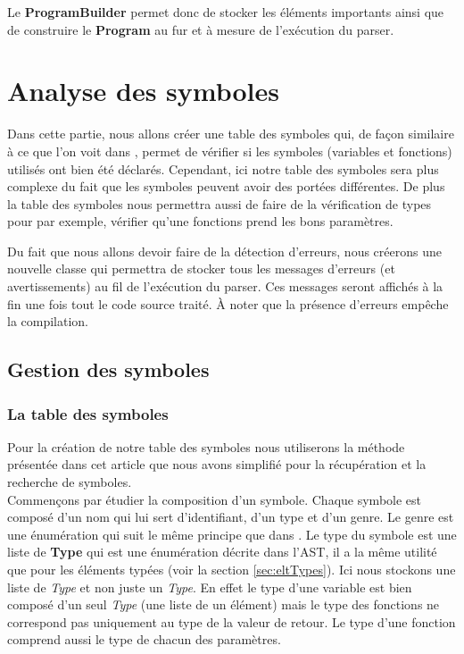 \documentclass[a4paper]{article}%
\begin{document}
Le \textbf{ProgramBuilder} permet donc de stocker les éléments importants ainsi
que de construire le \textbf{Program} au fur et à mesure de l'exécution du
\gls{parser}.


\section{Analyse des symboles}

Dans cette partie, nous allons créer une table des symboles qui, de façon
similaire à ce que l'on voit dans \cite{compilerFlexBison}, permet de vérifier
si les symboles (variables et fonctions) utilisés ont bien été déclarés.
Cependant, ici notre table des symboles sera plus complexe du fait que les
symboles peuvent avoir des portées différentes. De plus la table des symboles
nous permettra aussi de faire de la vérification de types pour par exemple,
vérifier qu'une fonctions prend les bons paramètres.

Du fait que nous allons devoir faire de la détection d'erreurs, nous créerons
une nouvelle classe qui permettra de stocker tous les messages d'erreurs (et
avertissements) au fil de l'exécution du \gls{parser}. Ces messages seront affichés à
la fin une fois tout le code source traité. À noter que la présence d'erreurs
empêche la compilation.

\subsection{Gestion des symboles}

\subsubsection*{La table des symboles}

Pour la création de notre table des symboles nous utiliserons la méthode
présentée dans cet article \cite{power2000symbol} que nous avons simplifié pour
la récupération et la recherche de symboles.\\

Commençons par étudier la composition d'un symbole. Chaque symbole est composé
d'un nom qui lui sert d'identifiant, d'un type et d'un genre. Le genre est une
énumération qui suit le même principe que dans \cite{power2000symbol}. Le type
du symbole est une liste de \textbf{Type} qui est une énumération décrite dans
l'AST, il a la même utilité que pour les éléments typées (voir la section
\ref{sec:eltTypes}). Ici nous stockons une liste de \textit{Type} et non
juste un \textit{Type}. En effet le type d'une variable est bien composé d'un
seul \textit{Type} (une liste de un élément) mais le type des fonctions ne
correspond pas uniquement au type de la valeur de retour. Le type d'une fonction
comprend aussi le type de chacun des paramètres.
\end{document}
